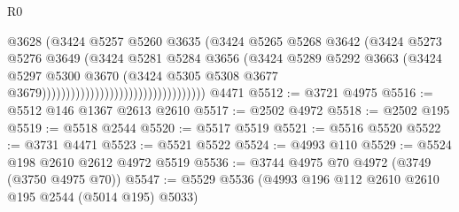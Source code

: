 \begin{lexlean}{R0}
\begin{coremodule}
                                                          @3628
                                                          (@3424
                                                            @5257
                                                            @5260
                                                            @3635
                                                            (@3424
                                                              @5265
                                                              @5268
                                                              @3642
                                                              (@3424
                                                                @5273
                                                                @5276
                                                                @3649
                                                                (@3424
                                                                  @5281
                                                                  @5284
                                                                  @3656
                                                                  (@3424
                                                                    @5289
                                                                    @5292
                                                                    @3663
                                                                    (@3424
                                                                      @5297
                                                                      @5300
                                                                      @3670
                                                                      (@3424
                                                                        @5305
                                                                        @5308
                                                                        @3677
                                                                        @3679))))))))))))))))))))))))))))))))))
    @4471
@5512 := @3721 @4975
@5516 := @5512 @146 @1367 @2613 @2610
@5517 := @2502 @4972
@5518 := @2502 @195
@5519 := @5518 @2544
@5520 := @5517 @5519
@5521 := @5516 @5520
@5522 := @3731 @4471
@5523 := @5521 @5522
@5524 := @4993 @110
@5529 := @5524 @198 @2610 @2612 @4972 @5519
@5536 := @3744 @4975 @70 @4972 (@3749 (@3750 @4975 @70))
@5547 := @5529 @5536 (@4993 @196 @112 @2610 @2610 @195 @2544 (@5014 @195) @5033)

\end{coremodule}
\end{lexlean}
